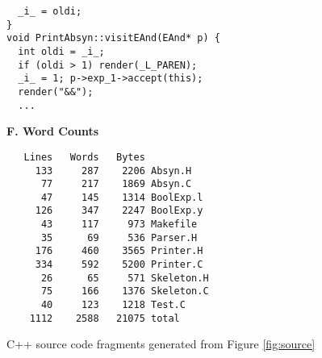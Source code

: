\begin{figure}
\begin{boxedminipage}[t]{\textwidth}
\begin{minipage}[r]{0.5\textwidth}
\begin{verbatim}
  _i_ = oldi;
}
void PrintAbsyn::visitEAnd(EAnd* p) {
  int oldi = _i_;
  if (oldi > 1) render(_L_PAREN);
  _i_ = 1; p->exp_1->accept(this);
  render("&&");
  ...
\end{verbatim}
\normalsize
\textbf{F. Word Counts}
\scriptsize
\begin{verbatim}
   Lines   Words   Bytes
     133     287    2206 Absyn.H
      77     217    1869 Absyn.C
      47     145    1314 BoolExp.l
     126     347    2247 BoolExp.y
      43     117     973 Makefile
      35      69     536 Parser.H
     176     460    3565 Printer.H
     334     592    5200 Printer.C
      26      65     571 Skeleton.H
      75     166    1376 Skeleton.C
      40     123    1218 Test.C
    1112    2588   21075 total

\end{verbatim}
\normalsize
\hfill
\end{minipage}
\end{boxedminipage}
\caption{C++ source code fragments generated from Figure \ref{fig:source}}
\label{fig:cpp}
\end{figure}

